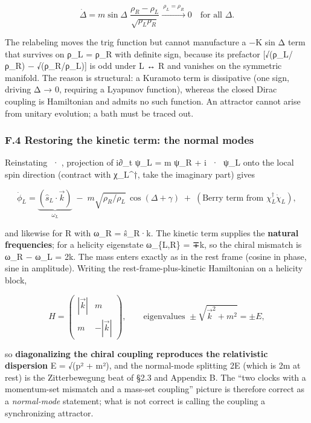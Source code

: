 \documentclass[
]{article}
\begin{document}
\[\dot\Delta = m\sin\Delta\;\frac{\rho_R - \rho_L}{\sqrt{\rho_L\rho_R}} \xrightarrow{\ \rho_L = \rho_R\ } 0 \quad\text{for all }\Delta.\]

The relabeling moves the trig function but cannot manufacture a −K sin Δ
term that survives on ρ\_L = ρ\_R with definite sign, because its
prefactor {[}√(ρ\_L/ρ\_R) − √(ρ\_R/ρ\_L){]} is odd under L ↔ R and
vanishes on the symmetric manifold. The reason is structural: a Kuramoto
term is dissipative (one sign, driving Δ → 0, requiring a Lyapunov
function), whereas the closed Dirac coupling is Hamiltonian and admits
no such function. An attractor cannot arise from unitary evolution; a
bath must be traced out.

\subsubsection{F.4 Restoring the kinetic term: the normal
modes}\label{f.4-restoring-the-kinetic-term-the-normal-modes}

Reinstating σ⃗·∇, projection of i∂\_t ψ\_L = m ψ\_R + i σ⃗·∇ ψ\_L onto the
local spin direction (contract with χ\_L\^{}†, take the imaginary part)
gives

\[\dot\phi_L = \underbrace{(\hat{s}_L\cdot\vec{k})}_{\omega_L} \;-\; m\sqrt{\rho_R/\rho_L}\,\cos(\Delta + \gamma) \;+\; (\text{Berry term from }\chi_L^\dagger\dot\chi_L),\]

and likewise for R with ω\_R = ŝ\_R·k⃗. The kinetic term supplies the
\textbf{natural frequencies}; for a helicity eigenstate ω\_\{L,R\} =
∓\textbar k⃗\textbar, so the chiral mismatch is ω\_R − ω\_L =
2\textbar k⃗\textbar. The mass enters exactly as in the rest frame
(cosine in phase, sine in amplitude). Writing the
rest-frame-plus-kinetic Hamiltonian on a helicity block,

\[H = \begin{pmatrix} |\vec{k}| & m \\ m & -|\vec{k}| \end{pmatrix}, \qquad \text{eigenvalues } \pm\sqrt{\vec{k}^2 + m^2} = \pm E,\]

so \textbf{diagonalizing the chiral coupling reproduces the relativistic
dispersion} E = √(p² + m²), and the normal-mode splitting 2E (which is
2m at rest) is the Zitterbewegung beat of §2.3 and Appendix B. The ``two
clocks with a momentum-set mismatch and a mass-set coupling'' picture is
therefore correct as a \emph{normal-mode} statement; what is not correct
is calling the coupling a synchronizing attractor.
\end{document}

